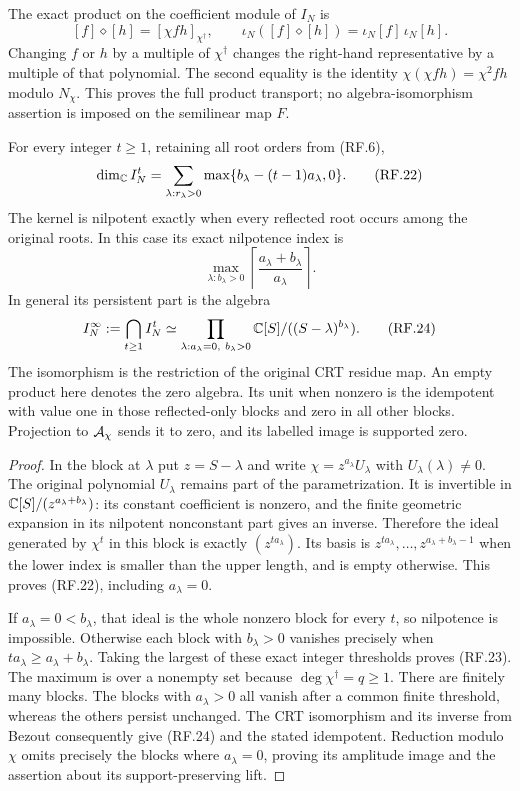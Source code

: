 The exact product on the coefficient module of $I_N$ is
\[
 [f]\diamond[h]=[\chi fh]_{\chi^\dagger},\qquad
 \iota_N([f]\diamond[h])=\iota_N[f]\,\iota_N[h].
 \tag{RF.21}
\]
Changing $f$ or $h$ by a multiple of $\chi^\dagger$ changes the
right-hand representative by a multiple of that polynomial.
The second equality is the identity $\chi(\chi fh)=\chi^2fh$
modulo $N_\chi$. This proves the full product transport; no
algebra-isomorphism assertion is imposed on the semilinear map $F$.

\begin{theorem}
For every integer $t\ge1$, retaining all root orders from (RF.6),
\[
 \dim_{\mathbb C} I_N^t
    =\sum_{\lambda:r_\lambda>0}
       \max\{b_\lambda-(t-1)a_\lambda,0\}.
 \tag{RF.22}
\]
The kernel is nilpotent exactly when every reflected root occurs
among the original roots. In this case its exact nilpotence index is
\[
 \max_{\lambda:b_\lambda>0}
       \left\lceil\frac{a_\lambda+b_\lambda}{a_\lambda}\right\rceil.
 \tag{RF.23}
\]
In general its persistent part is the algebra
\[
 I_N^\infty:=\bigcap_{t\ge1}I_N^t
   \simeq\prod_{\lambda:a_\lambda=0,\ b_\lambda>0}
           \mathbb C[S]/((S-\lambda)^{b_\lambda}).
 \tag{RF.24}
\]
The isomorphism is the restriction of the original CRT residue map.
An empty product here denotes the zero algebra. Its unit when
nonzero is the idempotent with value one in those reflected-only
blocks and zero in all other blocks. Projection to $\mathcal A_\chi$
sends it to zero, and its labelled image is supported zero.
\end{theorem}

\begin{proof}
In the block at $\lambda$ put $z=S-\lambda$ and write
$\chi=z^{a_\lambda}U_\lambda$ with $U_\lambda(\lambda)\ne0$.
The original polynomial $U_\lambda$ remains part of the
parametrization. It is invertible in
$\mathbb C[S]/(z^{a_\lambda+b_\lambda})$: its constant coefficient
is nonzero, and the finite geometric expansion in its nilpotent
nonconstant part gives an inverse. Therefore the ideal generated
by $\chi^t$ in this block is exactly $(z^{t a_\lambda})$.
Its basis is $z^{t a_\lambda},\ldots,
z^{a_\lambda+b_\lambda-1}$ when the lower index is smaller
than the upper length, and is empty otherwise. This proves
(RF.22), including $a_\lambda=0$.

If $a_\lambda=0<b_\lambda$, that ideal is the whole nonzero
block for every $t$, so nilpotence is impossible. Otherwise
each block with $b_\lambda>0$ vanishes precisely when
$t a_\lambda\ge a_\lambda+b_\lambda$. Taking the largest
of these exact integer thresholds proves (RF.23). The maximum
is over a nonempty set because $\deg\chi^\dagger=q\ge1$.
There are finitely many blocks. The blocks with $a_\lambda>0$
all vanish after a common finite threshold, whereas the others
persist unchanged. The CRT isomorphism and its inverse from
Bezout consequently give (RF.24) and the stated idempotent.
Reduction modulo $\chi$ omits precisely the blocks where
$a_\lambda=0$, proving its amplitude image and the assertion
about its support-preserving lift.
\end{proof}

